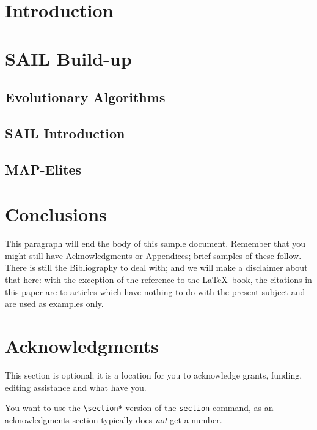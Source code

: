 \documentclass{sig-alternate}
\begin{document}

\section{Introduction}
\label{sec:introduction}



\section{SAIL Build-up}
\label{sec:body}

\subsection{Evolutionary Algorithms}
\label{sec:typeChangesSpecialChars}

\subsection{SAIL Introduction}
\label{sec:mathEquations}

\subsection{MAP-Elites}
\label{sec:displayEquations}

\section{Conclusions}
\label{sec:conclusions}

This paragraph will end the body of this sample document.
Remember that you might still have Acknowledgments or
Appendices; brief samples of these
follow.  There is still the Bibliography to deal with; and
we will make a disclaimer about that here: with the exception
of the reference to the \LaTeX\ book, the citations in
this paper are to articles which have nothing to
do with the present subject and are used as
examples only.

\section*{Acknowledgments}
\label{sec:acknowledgments}

This section is optional; it is a location for you
to acknowledge grants, funding, editing assistance and
what have you.

You want to use the \texttt{\textbackslash section*} version of the \texttt{section}
command, as an acknowledgments section typically does \emph{not} get
a number.
\end{document}
